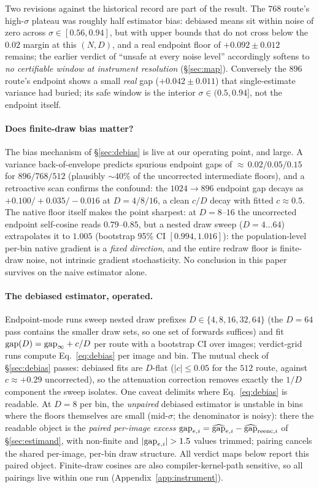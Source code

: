 Two revisions against the historical record are part of the result. The
$768$ route's high-$\sigma$ plateau was roughly half estimator bias:
debiased means sit within noise of zero across $\sigma \in [0.56,
0.94]$, but with upper bounds that do not cross below the $0.02$ margin
at this $(N, D)$, and a real endpoint floor of $+0.092 \pm 0.012$
remains; the earlier verdict of ``unsafe at every noise level''
accordingly softens to \emph{no certifiable window at
instrument resolution} (\S\ref{sec:map}). Conversely the $896$ route's
endpoint shows a small \emph{real} gap ($+0.042 \pm 0.011$) that
single-estimate variance had buried; its safe window is the interior
$\sigma \in (0.5, 0.94]$, not the endpoint itself.

\paragraph{Does finite-draw bias matter?}
The bias mechanism of \S\ref{sec:debias} is live at our operating
point, and large. A variance back-of-envelope predicts spurious
endpoint gaps of ${\approx}\,0.02 / 0.05 / 0.15$ for $896/768/512$
(plausibly ${\sim}40\%$ of the uncorrected intermediate floors), and a
retroactive scan confirms the confound: the $1024{\to}896$ endpoint gap
decays as ${+}0.100 / {+}0.035 / {-}0.016$ at $D = 4/8/16$, a clean
$c/D$ decay with fitted $c \approx 0.5$. The native floor itself makes
the point sharpest: at $D{=}8$--$16$ the uncorrected endpoint
self-cosine reads $0.79$--$0.85$, but a nested draw sweep
($D = 4 \ldots 64$) extrapolates it to $1.005$ (bootstrap 95\% CI
$[0.994, 1.016]$): the population-level per-bin native gradient is a
\emph{fixed direction}, and the entire redraw floor is finite-draw
noise, not intrinsic gradient stochasticity. No conclusion in this
paper survives on the naive estimator alone.

\paragraph{The debiased estimator, operated.}
Endpoint-mode runs sweep nested draw prefixes
$D \in \{4, 8, 16, 32, 64\}$ (the $D{=}64$ pass contains the smaller
draw sets, so one set of forwards suffices) and fit
$\mathrm{gap}(D) = \mathrm{gap}_\infty + c/D$ per route with a bootstrap CI over
images; verdict-grid runs compute Eq.~\ref{eq:debias} per image and
bin. The mutual check of \S\ref{sec:debias} passes: debiased fits are
$D$-flat ($|c| \le 0.05$ for the $512$ route, against
$c \approx +0.29$ uncorrected), so the attenuation correction removes
exactly the $1/D$ component the sweep isolates.
One caveat delimits where Eq.~\ref{eq:debias} is readable. At $D{=}8$
per bin, the \emph{unpaired} debiased estimator is unstable in bins
where the floors themselves are small (mid-$\sigma$; the denominator is
noisy): there the readable object is the \emph{paired per-image excess}
$\mathrm{gap}_{e,i} = \widehat{\mathrm{gap}}_{e,i} - \widehat{\mathrm{gap}}_{\mathrm{reenc},i}$ of \S\ref{sec:estimand},
with non-finite and $|\mathrm{gap}_{e,i}| > 1.5$ values trimmed; pairing cancels
the shared per-image, per-bin draw structure. All verdict maps below
report this paired object. Finite-draw cosines are also
compiler-kernel-path sensitive, so all pairings live within one run
(Appendix~\ref{app:instrument}).

